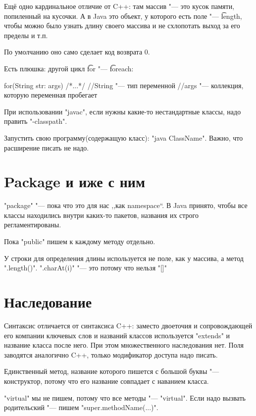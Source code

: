Ещё одно кардинальное отличие от C++: там массив "--- это кусок памяти, попиленный на кусочки.
А в Java это объект, у которого есть поле "--- \t{length},
чтобы можно было узнать длину своего массива и не схлопотать выход за его пределы и т.п.

По умолчанию оно само сделает код возврата 0.

Есть плюшка: другой цикл \t{for} "--- \t{foreach}:
\begin{javacode}
	for(String str: args) {
		/*...*/
	}
//String "--- тип переменной
//args "--- коллекция, которую переменная пробегает
\end{javacode}

При использовании \bash"javac", если нужны какие-то нестандартные классы, надо править \bash"-classpath".

Запустить свою программу(содержащую класс): \bash"java ClassName".
Важно, что расширение писать не надо.

\section{Package и иже с ним}

\java"package" "--- пока что это для нас ,,как namespace``.
В Java принято, чтобы все классы находились внутри каких-то пакетов,
названия их строго регламентированы.

Пока \java"public" пишем к каждому методу отдельно.

У строки для определения длины используется не поле, как у массива,
а метод \java".length()".
\java".charAt(i)" "--- это потому что нельзя \java"[]"

\section{Наследование}

Синтаксис отличается %
от синтаксиса C++: заместо двоеточия и сопровождающей его компании ключевых слов и названий классов
используется \java"extends" и название класса после него.
При этом множественного наследования нет.
Поля заводятся аналогично C++, только модификатор доступа надо писать.

Единственный метод, название которого пишется с большой буквы "--- конструктор,
потому что его название совпадает с наванием класса.

\cpp"virtual" мы не пишем, потому что все методы "--- \cpp"virtual".
Если надо вызвать родительский "--- пишем \java"super.methodName(...)".

